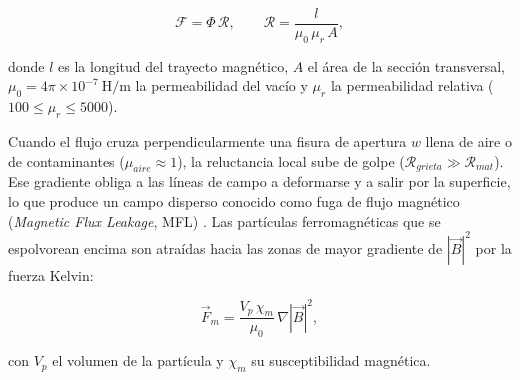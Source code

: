 \begin{equation}
  \mathcal{F} = \Phi\,\mathcal{R},
  \qquad
  \mathcal{R} = \frac{l}{\mu_0\,\mu_r\,A},
  \label{eq:hopkinson-reluctancia}
\end{equation}

donde $l$ es la longitud del trayecto magnético, $A$ el área de la sección
transversal, $\mu_0 = 4\pi\times10^{-7}\ \text{H/m}$ la permeabilidad del vacío y
$\mu_r$ la permeabilidad relativa ($100 \le \mu_r \le 5000$).

Cuando el flujo cruza perpendicularmente una fisura de apertura $w$ llena de aire o
de contaminantes ($\mu_{aire}\approx 1$), la reluctancia local sube de golpe
($\mathcal{R}_{grieta} \gg \mathcal{R}_{mat}$). Ese gradiente obliga a las líneas de
campo a deformarse y a salir por la superficie, lo que produce un campo disperso
conocido como fuga de flujo magnético (\textit{Magnetic Flux Leakage}, MFL)
\parencite{rao2012}. Las partículas ferromagnéticas que se espolvorean encima son
atraídas hacia las zonas de mayor gradiente de $|\vec{B}|^2$ por la fuerza Kelvin:

\begin{equation}
  \vec{F}_m = \frac{V_p\,\chi_m}{\mu_0}\,\nabla |\vec{B}|^2,
  \label{eq:fuerza-kelvin}
\end{equation}

con $V_p$ el volumen de la partícula y $\chi_m$ su susceptibilidad magnética.

